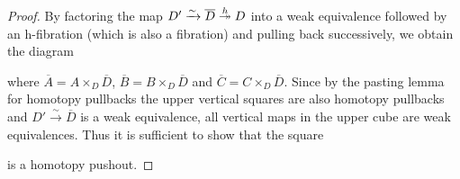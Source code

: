 \begin{prop}
\begin{proof}
        By factoring the map $D'\xrightarrow{\sim}\overline{D}\xtwoheadrightarrow{h} D$ into a weak equivalence followed by an h-fibration (which is also a fibration) and pulling back successively, we obtain the diagram
        \begin{center}
        \end{center}
        where $\overline{A}=A\times_{D}\overline{D}$, $\overline{B}=B\times_{D}\overline{D}$ and $\overline{C}=C\times_{D}\overline{D}$.
        Since by the pasting lemma for homotopy pullbacks the upper vertical squares are also homotopy pullbacks and $D'\xrightarrow{\sim}\overline{D}$ is a weak equivalence, all vertical maps in the upper cube are weak equivalences.
        Thus it is sufficient to show that the square
        \begin{center}
        \end{center}
        is a homotopy pushout.


\end{proof}
\end{prop}
